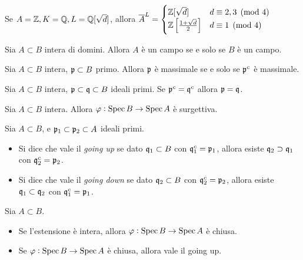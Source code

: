 \begin{example}
    Se $A=\mathbb{Z}, K=\mathbb{Q}, L=\mathbb{Q}[\sqrt d]$, allora $\overline{A}^L=\begin{cases}
    \mathbb{Z}[\sqrt d] & d\equiv 2,3\pmod 4 \\
    \mathbb{Z}\left[ \frac{1+\sqrt d}{2} \right] & d\equiv 1\pmod 4
    \end{cases}$
\end{example}

\begin{lemma}
    Sia $A\subset B$ intera di domini. Allora $A$ è un campo se e solo se $B$ è un campo.
\end{lemma}

\begin{corollary}
    Sia $A\subset B$ intera, $\mathfrak{p}\subset B$ primo. Allora $\mathfrak{p}$ è massimale se e solo se $\mathfrak{p}^c$ è massimale.
\end{corollary}

\begin{corollary}
    Sia $A\subset B$ intera, $\mathfrak{p}\subset \mathfrak{q}\subset B$ ideali primi. Se $\mathfrak{p}^c=\mathfrak{q}^c$ allora $\mathfrak{p}=\mathfrak{q}$.
\end{corollary}

\begin{theorem}
    Sia $A\subset B$ intera. Allora $\varphi:\operatorname{Spec} B\to\operatorname{Spec} A$ è surgettiva.
\end{theorem}

\begin{definition} Sia $A\subset B$, e $\mathfrak{p}_1\subset \mathfrak{p}_2\subset A$ ideali primi.
    \begin{itemize}
        \item Si dice che vale il \emph{going up} se dato $\mathfrak{q}_1\subset B$ con $\mathfrak{q}_1^c=\mathfrak{p}_1$, allora esiste $\mathfrak{q}_2\supset\mathfrak{q}_1$ con $\mathfrak{q}_2^c=\mathfrak{p}_2$.
        \item Si dice che vale il \emph{going down} se dato $\mathfrak{q}_2\subset B$ con $\mathfrak{q}_2^c=\mathfrak{p}_2$, allora esiste $\mathfrak{q}_1\subset\mathfrak{q}_2$ con $\mathfrak{q}_1^c=\mathfrak{p}_1$.
    \end{itemize}
\end{definition}

\begin{theorem} Sia $A\subset B$.
    \begin{itemize}
        \item Se l'estensione è intera, allora $\varphi: \operatorname{Spec} B\to\operatorname{Spec} A$ è chiusa.
        \item Se $\varphi: \operatorname{Spec} B\to\operatorname{Spec} A$ è chiusa, allora vale il going up.
    \end{itemize}
\end{theorem}

